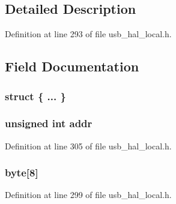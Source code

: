 \subsection{Detailed Description}


Definition at line 293 of file usb\+\_\+hal\+\_\+local.\+h.



\subsection{Field Documentation}
\hypertarget{union___b_u_f_f_e_r___d_e_s_c_r_i_p_t_o_r_ac4dac9af17b0d24fde3c0567b711183b}{}\subsubsection[{"@534}]{\setlength{\rightskip}{0pt plus 5cm}struct \{ ... \} }\label{union___b_u_f_f_e_r___d_e_s_c_r_i_p_t_o_r_ac4dac9af17b0d24fde3c0567b711183b}
\hypertarget{union___b_u_f_f_e_r___d_e_s_c_r_i_p_t_o_r_ab36863a07751ac73459d46b677c33b57}{}
\subsubsection[{addr}]{\setlength{\rightskip}{0pt plus 5cm}unsigned int addr}\label{union___b_u_f_f_e_r___d_e_s_c_r_i_p_t_o_r_ab36863a07751ac73459d46b677c33b57}


Definition at line 305 of file usb\+\_\+hal\+\_\+local.\+h.

\hypertarget{union___b_u_f_f_e_r___d_e_s_c_r_i_p_t_o_r_a1b091cb78cd83c23d339ef1fadd0e319}{}
\subsubsection[{byte}]{ byte\mbox{[}8\mbox{]}}\label{union___b_u_f_f_e_r___d_e_s_c_r_i_p_t_o_r_a1b091cb78cd83c23d339ef1fadd0e319}


Definition at line 299 of file usb\+\_\+hal\+\_\+local.\+h.

